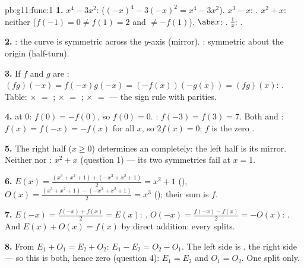 \begin{solution}{pb:g11:func:1}
\textbf{1.} $x^4 - 3x^2$:  ($(-x)^4 - 3(-x)^2 = x^4 -
3x^2$). $x^3 - x$: . $x^2 + x$: neither ($f(-1) = 0 \neq
f(1) = 2$ and $\neq -f(1)$). $\abs x$: . $\frac1x$: .

\textbf{2.} : the curve is symmetric across the $y$-axis
(mirror). : symmetric about the origin (half-turn).

\textbf{3.} If $f$ and $g$ are :
$(fg)(-x) = f(-x)g(-x) = (-f(x))(-g(x)) = (fg)(x)$: .
Table:  $\times$  $=$ ;  $\times$  $=$ ;
 $\times$  $=$  --- the sign rule with parities.

\textbf{4.}  at $0$: $f(0) = -f(0)$, so $f(0) = 0$. :
$f(-3) = f(3) = 7$. Both  and :
$f(x) = f(-x) = -f(x)$ for all $x$, so $2f(x) = 0$: $f$ is the
zero .

\textbf{5.} The right half ($x \geq 0$) determines an  completely: the left half is its mirror. Neither 
nor : $x^2 + x$ (question 1) --- its two symmetries fail at
$x = 1$.

\textbf{6.} $E(x) = \frac{(x^3 + x^2 + 1) + (-x^3 + x^2 +
1)}{2} = x^2 + 1$ (), $O(x) = \frac{(x^3 + x^2 + 1) -
(-x^3 + x^2 + 1)}{2} = x^3$ (); their sum is $f$.

\textbf{7.} $E(-x) = \frac{f(-x) + f(x)}{2} = E(x)$: .
$O(-x) = \frac{f(-x) - f(x)}{2} = -O(x)$: . And
$E(x) + O(x) = f(x)$ by direct addition: every 
splits.

\textbf{8.} From $E_1 + O_1 = E_2 + O_2$:
$E_1 - E_2 = O_2 - O_1$. The left side is , the right side
 --- so this  is both, hence zero (question 4):
$E_1 = E_2$ and $O_1 = O_2$. One split only.


\end{solution}
